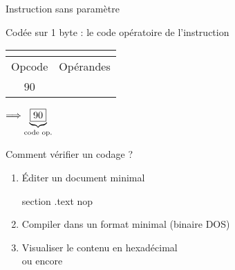 \documentclass[14pt,xcolor,table]{beamer}
\begin{document}
\begin{frame}[fragile]{Instruction sans paramètre}

	Codée sur 1 byte : le code opératoire de l'instruction
	\begin{center}
		\emph{}
	\end{center}

	\bigskip 

	\begin{center}
	\begin{footnotesize}
	\begin{tabular}{|c|c|}
		\multicolumn{2}{c}{\asm{NOP}}\\\hline
		{\cellcolor{gray!25}Opcode} & {\cellcolor{gray!25}Opérandes} \\\hline
		90 & \\\hline
	\end{tabular}
	\end{footnotesize}
	\end{center}

	\begin{center}
		 $\Longrightarrow \underbrace{\fbox{90}}_{\text{code op.}}$ 
	\end{center}

\end{frame}

\begin{frame}[fragile]{Comment vérifier un codage ?}

  \begin{enumerate}
  \item
	Éditer un document minimal
  \begin{Asm}
	section .text
	nop
  \end{Asm}
  \item
	Compiler dans un format minimal (binaire DOS)\\
  \item
	Visualiser le contenu en hexadécimal\\
	 ou encore 
  \end{enumerate}
	
\end{frame}
\end{document}
